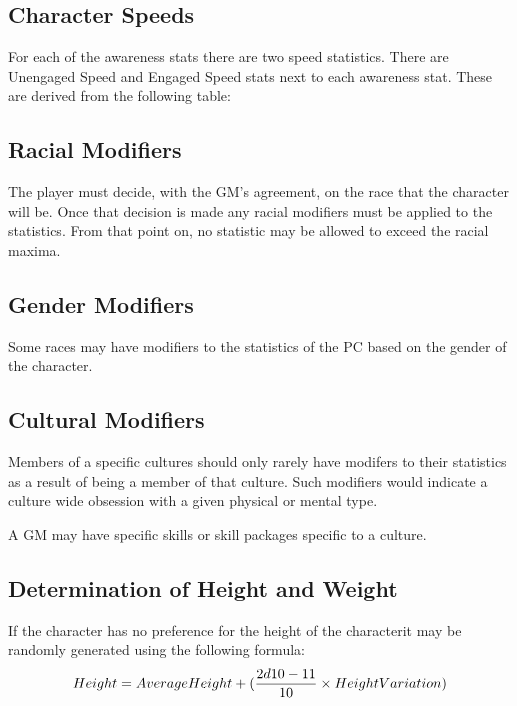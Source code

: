 \subsection{Character Speeds}

For each of the awareness stats there are two speed statistics. 
There are Unengaged Speed and Engaged Speed stats next to each
awareness stat. These are derived from the following table:



\subsection{Racial Modifiers}

The player must decide, with the GM's agreement, on the race that the 
character will be. Once that decision is made any racial modifiers 
must be applied to the statistics. From that point on, no statistic 
may be allowed to exceed the racial maxima.

\subsection{Gender Modifiers}

Some races may have modifiers to the statistics of the PC based on 
the gender of the character. 

\subsection{Cultural Modifiers}

Members of a specific cultures should only rarely have modifers 
to their statistics as a result of being a member of that culture.
Such modifiers would indicate a culture wide obsession with a given 
physical or mental type. 

A GM may have specific skills or skill packages specific to a culture.

\subsection{Determination of Height and Weight}

If the character has no preference for the height of the characterit 
may be randomly generated using the following formula: \\

\[ Height = {Average Height} + ( {{2d10 - 11} \over {10}} \times 
{Height Variation} )
\]

